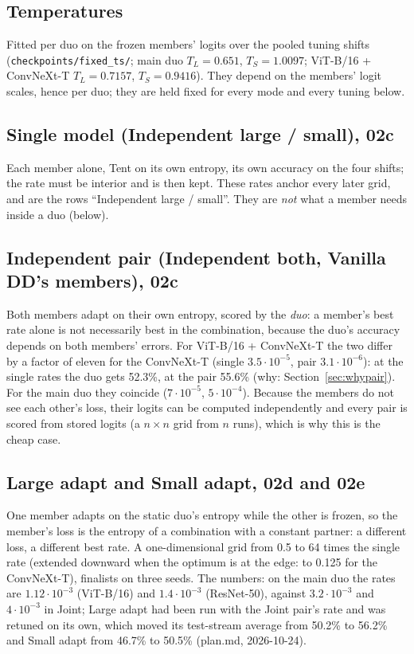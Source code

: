 \documentclass[10pt]{article}
\newcommand{\rl}[1]{\texttt{#1}}
\newcommand{\vit}{ViT-B/16}
\newcommand{\cnx}{ConvNeXt-T}
\newcommand{\rn}{ResNet-50}
\newcommand{\lr}[2]{\(#1{\cdot}10^{#2}\)}
\begin{document}
\subsection{Temperatures}
Fitted per duo on the frozen members' logits over the pooled tuning shifts (\rl{checkpoints/fixed\_ts/}; main duo \(T_L = 0.651\), \(T_S = 1.0097\); \vit{} + \cnx{} \(T_L = 0.7157\), \(T_S = 0.9416\)). They depend on the members' logit scales, hence per duo; they are held fixed for every mode and every tuning below.

\subsection{Single model (Independent large / small), 02c}
Each member alone, Tent on its own entropy, its own accuracy on the four shifts; the rate must be interior and is then kept. These rates anchor every later grid, and are the rows ``Independent large / small''. They are \emph{not} what a member needs inside a duo (below).

\subsection{Independent pair (Independent both, Vanilla DD's members), 02c}
Both members adapt on their own entropy, scored by the \emph{duo}: a member's best rate alone is not necessarily best in the combination, because the duo's accuracy depends on both members' errors. For \vit{} + \cnx{} the two differ by a factor of eleven for the \cnx{} (single \lr{3.5}{-5}, pair \lr{3.1}{-6}): at the single rates the duo gets 52.3\%, at the pair 55.6\% (why: Section~\ref{sec:whypair}). For the main duo they coincide (\lr{7}{-5}, \lr{5}{-4}). Because the members do not see each other's loss, their logits can be computed independently and every pair is scored from stored logits (a \(n\times n\) grid from \(n\) runs), which is why this is the cheap case.

\subsection{Large adapt and Small adapt, 02d and 02e}
One member adapts on the static duo's entropy while the other is frozen, so the member's loss is the entropy of a combination with a constant partner: a different loss, a different best rate. A one-dimensional grid from 0.5 to 64 times the single rate (extended downward when the optimum is at the edge: to 0.125 for the \cnx{}), finalists on three seeds. The numbers: on the main duo the rates are \lr{1.12}{-3} (\vit{}) and \lr{1.4}{-3} (\rn{}), against \lr{3.2}{-3} and \lr{4}{-3} in Joint; Large adapt had been run with the Joint pair's rate and was retuned on its own, which moved its test-stream average from 50.2\% to 56.2\% and Small adapt from 46.7\% to 50.5\% (plan.md, 2026-10-24).
\end{document}
